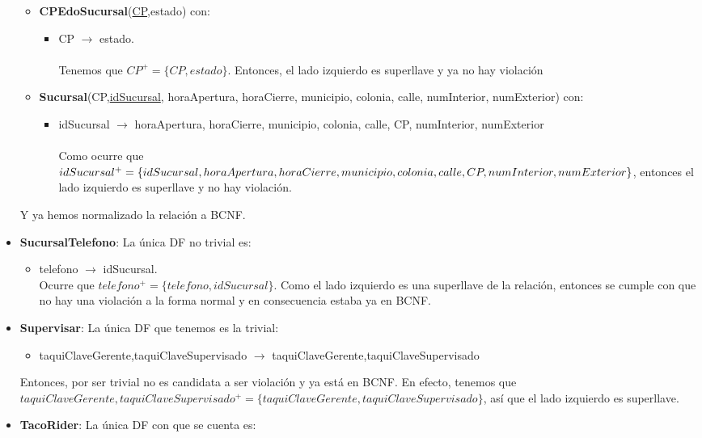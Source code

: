 \documentclass[11pt,letterpaper]{article}
\begin{document}
\begin{itemize}
\begin{itemize}
\item {\footnotesize \textbf{CPEdoSucursal}(\underline{CP},estado)} con:
\begin{itemize}
\item CP $\rightarrow$ estado.\\\\ Tenemos que $CP^+ = \{CP,estado\}$. Entonces, el lado izquierdo es superllave y ya no hay violación \checkmark
\end{itemize}
\item {\footnotesize \textbf{Sucursal}(CP,\underline{idSucursal}, horaApertura, horaCierre, municipio, colonia, calle, numInterior, numExterior)} con:
\begin{itemize}
\item idSucursal $\rightarrow$ horaApertura, horaCierre, municipio, colonia, calle, CP, numInterior, numExterior\\\\Como ocurre que $idSucursal^+=\{idSucursal,horaApertura, horaCierre, municipio,\\ colonia, calle, CP, numInterior, numExterior\}$, entonces el lado izquierdo es superllave y no hay violación. \checkmark
\end{itemize}
\end{itemize}

Y ya hemos normalizado la relación a BCNF.

\item \textbf{SucursalTelefono}: La única DF no trivial es:

\begin{itemize}
\item telefono $\rightarrow$ idSucursal.\\Ocurre que $telefono^+=\{telefono,idSucursal\}$. Como el lado izquierdo es una superllave de la relación, entonces se cumple con que no hay una violación a la forma normal y en consecuencia estaba ya en BCNF. \checkmark
\end{itemize}
\item \textbf{Supervisar}: La única DF que tenemos es la trivial:

\begin{itemize}
\item taquiClaveGerente,taquiClaveSupervisado $\rightarrow$ taquiClaveGerente,taquiClaveSupervisado
\end{itemize}

Entonces, por ser trivial no es candidata a ser violación y ya está en BCNF. En efecto, tenemos que $taquiClaveGerente,taquiClaveSupervisado^+ = \{taquiClaveGerente,taquiClaveSupervisado\}$, así que el lado izquierdo es superllave. \checkmark
\item \textbf{TacoRider}: La única DF con que se cuenta es:


\end{itemize}
\end{document}
